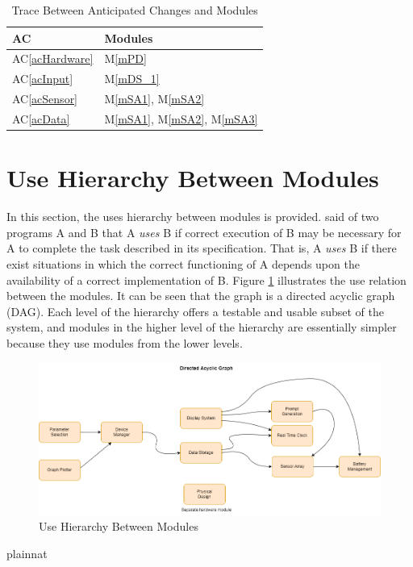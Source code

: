 \documentclass[12pt, titlepage]{article}
\newcommand{\acref}[1]{AC\ref{#1}}
\newcommand{\mref}[1]{M\ref{#1}}
\begin{document}
\begin{table}[H]
  \centering
  \begin{tabular}{p{} p{}}
    \toprule
    \textbf{AC}         & \textbf{Modules}  \\
    \midrule
    \acref{acHardware}  & \mref{mPD}        \\
    \acref{acInput}     & \mref{mDS_1}     \\
    \acref{acSensor}     & \mref{mSA1}, \mref{mSA2}     \\
    \acref{acData}     & \mref{mSA1}, \mref{mSA2}, \mref{mSA3}    \\
    \bottomrule
  \end{tabular}
  \caption{Trace Between Anticipated Changes and Modules}
  \label{TblACT}
\end{table}

\newpage

\section{Use Hierarchy Between Modules} \label{SecUse}

In this section, the uses hierarchy between modules is
provided. \citet{Parnas1978} said of two programs A and B that A {\em uses} B if
correct execution of B may be necessary for A to complete the task described in
its specification. That is, A {\em uses} B if there exist situations in which
the correct functioning of A depends upon the availability of a correct
implementation of B.  Figure \ref{FigUH} illustrates the use relation between
the modules. It can be seen that the graph is a directed acyclic graph
(DAG). Each level of the hierarchy offers a testable and usable subset of the
system, and modules in the higher level of the hierarchy are essentially simpler
because they use modules from the lower levels.

\begin{figure}[H]
  \centering
\includegraphics[width=\textwidth]{DAG.png}
  \caption{Use Hierarchy Between Modules}
  \label{FigUH}
\end{figure}

\newpage
 {plainnat}

\end{document}
